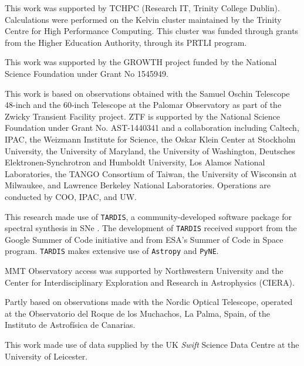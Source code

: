 \documentclass[twocolumn]{aastex63}
\begin{document}
This work was supported by TCHPC (Research IT, Trinity College Dublin).
Calculations were performed on the Kelvin cluster maintained by the Trinity
Centre for High Performance Computing. This cluster was funded through grants
from the Higher Education Authority, through its PRTLI program.

This work was supported by the GROWTH project funded by the National Science
Foundation under Grant No 1545949.

This work is based on observations obtained with the Samuel Oschin Telescope
48-inch and the 60-inch Telescope at the Palomar Observatory as part of the
Zwicky Transient Facility project. ZTF is supported by the National Science
Foundation under Grant No. AST-1440341 and a collaboration including Caltech,
IPAC, the Weizmann Institute for Science, the Oskar Klein Center at Stockholm
University, the University of Maryland, the University of Washington,
Deutsches Elektronen-Synchrotron and Humboldt University, Los Alamos National
Laboratories, the TANGO Consortium of Taiwan, the University of Wisconsin at
Milwaukee, and Lawrence Berkeley National Laboratories. Operations are
conducted by COO, IPAC, and UW.

This research made use of \texttt{TARDIS}, a community-developed software
package for spectral synthesis in SNe \citep{Kerzendorf14}. The development of
\texttt{TARDIS} received support from the Google Summer of Code initiative and
from ESA's Summer of Code in Space program. \texttt{TARDIS} makes extensive
use of \texttt{Astropy} and \texttt{PyNE}.

MMT Observatory access was supported by Northwestern University and the
Center for Interdisciplinary Exploration and Research in Astrophysics (CIERA).

Partly based on observations made with the Nordic Optical Telescope, operated
at the Observatorio del Roque de los Muchachos, La Palma, Spain, of the
Instituto de Astrof\'isica de Canarias.

This work made use of data supplied by the UK \textit{Swift} Science Data
Centre at the University of Leicester.

\end{document}
